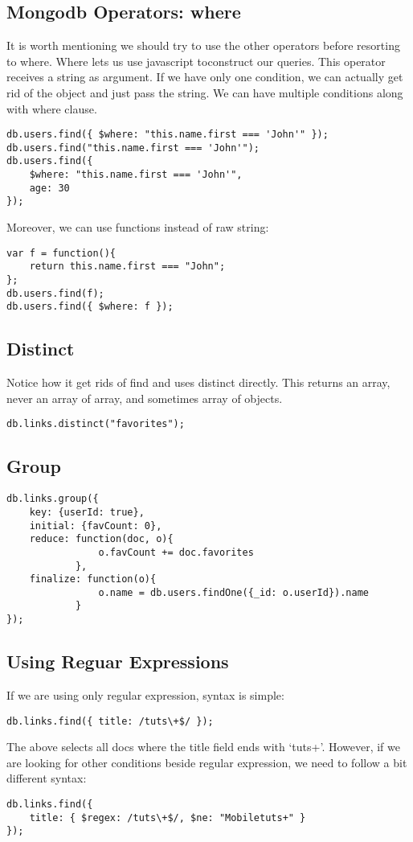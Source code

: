 \documentclass[a4paper, 12pt]{article}
\begin{document}
\subsection{Mongodb Operators: where}
It is worth mentioning we should try to use the other operators before resorting to where. Where lets us use javascript toconstruct our queries. This operator receives a string as argument. If we have only one condition, we can actually get rid of the object and just pass the string. We can have multiple conditions along with where clause.
\begin{verbatim}
db.users.find({ $where: "this.name.first === 'John'" });
db.users.find("this.name.first === 'John'");
db.users.find({ 
    $where: "this.name.first === 'John'", 
    age: 30 
});
\end{verbatim}
Moreover, we can use functions instead of raw string:
\begin{verbatim}
var f = function(){
    return this.name.first === "John";
};
db.users.find(f);
db.users.find({ $where: f });
\end{verbatim}
\subsection{Distinct}
Notice how it get rids of find and uses distinct directly. This returns an array, never an array of array, and sometimes array of objects.
\begin{verbatim}
db.links.distinct("favorites");
\end{verbatim}
\subsection{Group}
\begin{verbatim}
db.links.group({
    key: {userId: true},
    initial: {favCount: 0},
    reduce: function(doc, o){
                o.favCount += doc.favorites
            },
    finalize: function(o){
                o.name = db.users.findOne({_id: o.userId}).name
            }
});
\end{verbatim}
\subsection{Using Reguar Expressions}
If we are using only regular expression, syntax is simple:
\begin{verbatim}
db.links.find({ title: /tuts\+$/ });
\end{verbatim}
The above selects all docs where the title field ends with `tuts+'. However, if we are looking for other conditions beside regular expression, we need to follow a bit different syntax:
\begin{verbatim}
db.links.find({ 
    title: { $regex: /tuts\+$/, $ne: "Mobiletuts+" } 
});
\end{verbatim}
\end{document}
